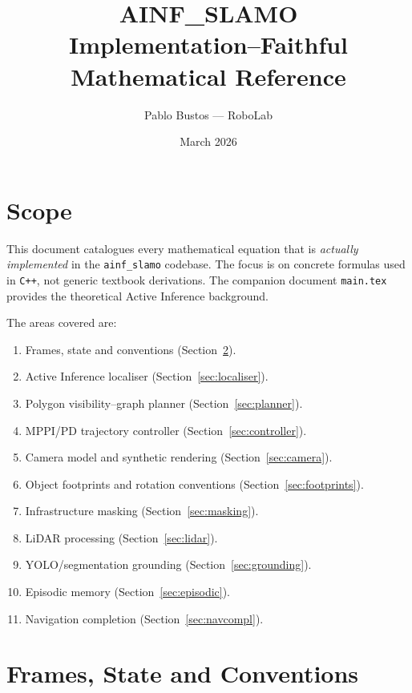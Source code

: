 \documentclass[a4paper, 11pt]{article}
\title{\textbf{AINF\_SLAMO} \\[4pt]
       \large Implementation--Faithful Mathematical Reference}
\author{Pablo Bustos --- RoboLab}
\date{March 2026}
\begin{document}
\maketitle
\tableofcontents
\newpage

\section{Scope}

This document catalogues every mathematical equation that is \emph{actually
implemented} in the \texttt{ainf\_slamo} codebase.
The focus is on concrete formulas used in \texttt{C++}, not generic textbook
derivations.
The companion document \texttt{main.tex} provides the theoretical Active
Inference background.

The areas covered are:

\begin{enumerate}[label=(\roman*)]
  \item Frames, state and conventions (Section~\ref{sec:frames}).
  \item Active Inference localiser (Section~\ref{sec:localiser}).
  \item Polygon visibility--graph planner (Section~\ref{sec:planner}).
  \item MPPI/PD trajectory controller (Section~\ref{sec:controller}).
  \item Camera model and synthetic rendering (Section~\ref{sec:camera}).
  \item Object footprints and rotation conventions (Section~\ref{sec:footprints}).
  \item Infrastructure masking (Section~\ref{sec:masking}).
  \item LiDAR processing (Section~\ref{sec:lidar}).
  \item YOLO/segmentation grounding (Section~\ref{sec:grounding}).
  \item Episodic memory (Section~\ref{sec:episodic}).
  \item Navigation completion (Section~\ref{sec:navcompl}).
\end{enumerate}

\section{Frames, State and Conventions}\label{sec:frames}
\end{document}

